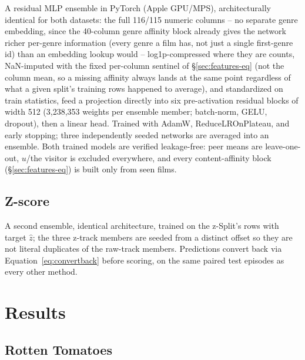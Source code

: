 \documentclass[11pt]{article}
\begin{document}
A residual MLP ensemble in PyTorch (Apple GPU/MPS), architecturally identical for both datasets: the full 116/115 numeric columns -- no separate genre embedding, since the 40-column genre affinity block already gives the network richer per-genre information (every genre a film has, not just a single first-genre id) than an embedding lookup would -- log1p-compressed where they are counts, NaN-imputed with the fixed per-column sentinel of \S\ref{sec:features-eq} (not the column mean, so a missing affinity always lands at the same point regardless of what a given split's training rows happened to average), and standardized on train statistics, feed a projection directly into six pre-activation residual blocks of width 512 (3{,}238{,}353 weights per ensemble member; batch-norm, GELU, dropout), then a linear head. Trained with AdamW, ReduceLROnPlateau, and early stopping; three independently seeded networks are averaged into an ensemble. Both trained models are verified leakage-free: peer means are leave-one-out, $u$/the visitor is excluded everywhere, and every content-affinity block (\S\ref{sec:features-eq}) is built only from seen films.

\subsection{Z-score}

A second ensemble, identical architecture, trained on the z-Split's rows with target $\hat z$; the three z-track members are seeded from a distinct offset so they are not literal duplicates of the raw-track members. Predictions convert back via Equation~\ref{eq:convertback} before scoring, on the same paired test episodes as every other method.

\section{Results}
\label{sec:results}

\subsection{Rotten Tomatoes}
\end{document}
